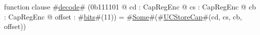 function clause #\hyperref[zdecode]{decode}# (0b111101 @ cd : CapRegEnc @ cs : CapRegEnc @ cb : CapRegEnc @ offset : #\hyperref[zbits]{bits}#(11)) = #\hyperref[zSome]{Some}#(#\hyperref[zUCStoreCap]{UCStoreCap}#(cd, cs, cb, offset))
